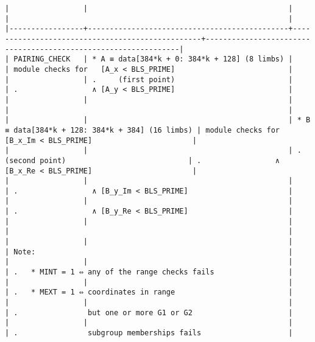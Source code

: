 \documentclass[varwidth=\maxdimen,margin=0.5cm,multi={verbatim}]{standalone}
\begin{document}
\begin{verbatim}
|                 |                                              |                                                 |                                                                |
|-----------------+----------------------------------------------+-------------------------------------------------+----------------------------------------------------------------|
| PAIRING_CHECK   | * A ≡ data[384*k + 0: 384*k + 128] (8 limbs) |                                                 | module checks for   [A_x < BLS_PRIME]                          |
|                 | .     (first point)                          |                                                 | .                 ∧ [A_y < BLS_PRIME]                          |
|                 |                                              |                                                 |                                                                |
|                 |                                              | * B ≡ data[384*k + 128: 384*k + 384] (16 limbs) | module checks for   [B_x_Im < BLS_PRIME]                       |
|                 |                                              | .     (second point)                            | .                 ∧ [B_x_Re < BLS_PRIME]                       |
|                 |                                              |                                                 | .                 ∧ [B_y_Im < BLS_PRIME]                       |
|                 |                                              |                                                 | .                 ∧ [B_y_Re < BLS_PRIME]                       |
|                 |                                              |                                                 |                                                                |
|                 |                                              |                                                 | Note:                                                          |
|                 |                                              |                                                 | .   * MINT = 1 ⇔ any of the range checks fails                 |
|                 |                                              |                                                 | .   * MEXT = 1 ⇔ coordinates in range                          |
|                 |                                              |                                                 | .                but one or more G1 or G2                      |
|                 |                                              |                                                 | .                subgroup memberships fails                    |

\end{verbatim}
\end{document}
